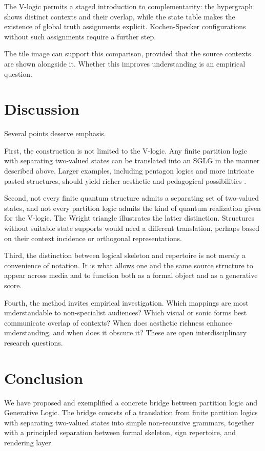 \documentclass[
  10pt,
  twocolumn,
  aps,
  pra,
  showkeys,
  amsmath,amssymb,
  longbibliography
]{revtex4-2}
\begin{document}
The V-logic permits a staged introduction to complementarity: the hypergraph shows distinct contexts and their overlap, while the state table makes the existence of global truth assignments explicit. Kochen-Specker configurations without such assignments require a further step.

The tile image can support this comparison, provided that the source contexts are shown alongside it. Whether this improves understanding is an empirical question.

\section{Discussion}

Several points deserve emphasis.

First, the construction is not limited to the V-logic. Any finite partition logic with separating two-valued states can be translated into an SGLG in the manner described above. Larger examples, including pentagon logics and more intricate pasted structures, should yield richer aesthetic and pedagogical possibilities \cite{wright,svozil-2001-eua}.

Second, not every finite quantum structure admits a separating set of two-valued states, and not every partition logic admits the kind of quantum realization given for the V-logic. The Wright triangle illustrates the latter distinction. Structures without suitable state supports would need a different translation, perhaps based on their context incidence or orthogonal representations.

Third, the distinction between logical skeleton and repertoire is not merely a convenience of notation. It is what allows one and the same source structure to appear across media and to function both as a formal object and as a generative score.

Fourth, the method invites empirical investigation. Which mappings are most understandable to non-specialist audiences? Which visual or sonic forms best communicate overlap of contexts? When does aesthetic richness enhance understanding, and when does it obscure it? These are open interdisciplinary research questions.

\section{Conclusion}

We have proposed and exemplified a concrete bridge between partition logic and Generative Logic. The bridge consists of a translation from finite partition logics with separating two-valued states into simple non-recursive grammars, together with a principled separation between formal skeleton, sign repertoire, and rendering layer.
\end{document}
